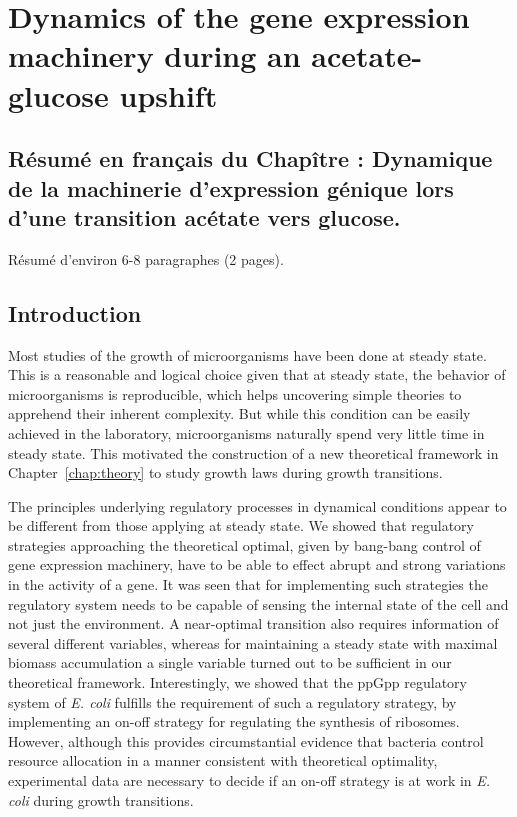 \chapter{Dynamics of the gene expression machinery during an acetate-glucose upshift}
\label{chap:experiments}


\section*{Résumé en français du Chapître \thechapter : Dynamique de la machinerie d'expression génique lors d'une transition acétate vers glucose.}

Résumé d'environ 6-8 paragraphes (2 pages).

\section{Introduction}

Most studies of the growth of microorganisms have been done at steady state.
This is a reasonable and logical choice given that at steady state, the behavior of microorganisms is reproducible, which helps uncovering simple theories to apprehend their inherent complexity.
But while this condition can be easily achieved in the laboratory, microorganisms naturally spend very little time in steady state.
This motivated the construction of a new theoretical framework in Chapter~\ref{chap:theory} to study growth laws during growth transitions.

The principles underlying regulatory processes in dynamical conditions appear to be different from those applying at steady state.
We showed that regulatory strategies approaching the theoretical optimal, given by bang-bang control of gene expression machinery, have to be able to effect abrupt and strong variations in the activity of a gene.
It was seen that for implementing such strategies the regulatory system needs to be capable of sensing the internal state of the cell and not just the environment.
A near-optimal transition also requires information of several different variables, whereas for maintaining a steady state with maximal biomass accumulation a single variable turned out to be sufficient in our theoretical framework.
Interestingly, we showed that the ppGpp regulatory system of \textit{E. coli} fulfills the requirement of such a regulatory strategy, by implementing an on-off strategy for regulating the synthesis of ribosomes.
However, although this provides circumstantial evidence that bacteria control resource allocation in a manner consistent with theoretical optimality, experimental data are necessary to decide if an on-off strategy is at work in \textit{E. coli} during growth transitions.

